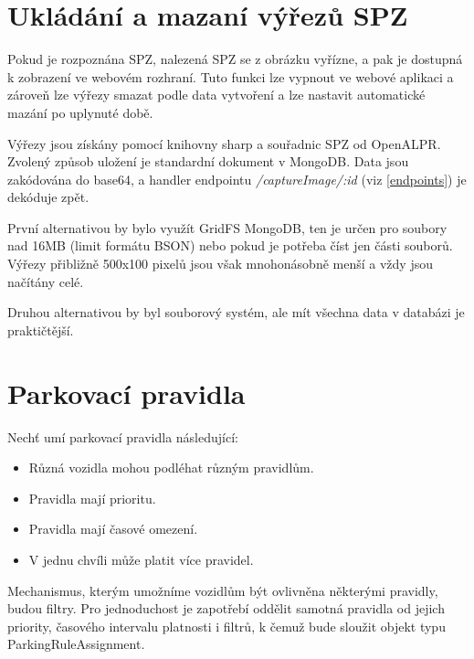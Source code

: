 \section{Ukládání a mazaní výřezů SPZ}

\noindent
Pokud je rozpoznána SPZ, nalezená SPZ se z obrázku vyřízne, a pak je dostupná k zobrazení ve webovém rozhraní.
Tuto funkci lze vypnout ve webové aplikaci a zároveň lze výřezy smazat podle data vytvoření a
lze nastavit automatické mazání po uplynuté době.

Výřezy jsou získány pomocí knihovny sharp a souřadnic SPZ od OpenALPR.
Zvolený způsob uložení je standardní dokument v MongoDB. Data jsou zakódována do base64,
a handler endpointu \textit{/captureImage/:id} (viz \ref{endpoints}) je dekóduje zpět.

První alternativou by bylo využít GridFS MongoDB, ten je určen pro soubory
nad 16MB (limit formátu BSON) nebo pokud je potřeba číst jen části souborů.
Výřezy přibližně 500x100 pixelů jsou však mnohonásobně menší a vždy jsou načítány celé.

Druhou alternativou by byl souborový systém, ale mít všechna data v databázi je praktičtější.

\section{Parkovací pravidla} \label{analysis_parking_schema}

\noindent
Nechť umí parkovací pravidla následující:

\begin{itemize}
  \setlength\itemsep{.05em}
  \item Různá vozidla mohou podléhat různým pravidlům.
  \item Pravidla mají prioritu.
  \item Pravidla mají časové omezení.
  \item V jednu chvíli může platit více pravidel.
\end{itemize}

Mechanismus, kterým umožníme vozidlům být ovlivněna některými pravidly,
budou filtry.
Pro jednoduchost je zapotřebí oddělit samotná pravidla od jejich
priority, časového intervalu platnosti i filtrů,
k čemuž bude sloužit objekt typu ParkingRuleAssignment.

